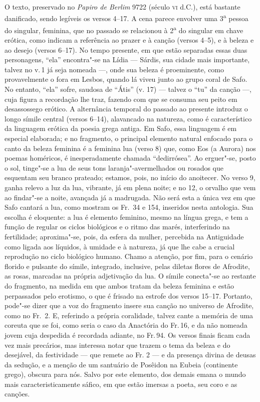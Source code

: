 {{\small O texto, preservado no \textit{Papiro de Berlim} 9722 (século \textsc{vi}
d.C.), está bastante danificado, sendo legíveis os versos 4--17.
A cena parece envolver uma 3\textsuperscript{a} pessoa do
singular, feminina, que no passado se relacionou à 2\textsuperscript{a} do
singular em chave erótica, como indicam a referência ao prazer e à canção		
(versos 4--5), e à beleza e ao desejo (versos 6--17). No tempo presente, 
em que estão separadas essas duas personagens, ``ela” encontra"-se na Lídia --- Sárdis, sua cidade mais importante, talvez no v.\,1 já seja nomeada ---, onde sua beleza é proeminente, como provavelmente o fora em Lesbos, quando lá viveu junto ao grupo coral de Safo. No entanto, ``ela” sofre, saudosa de ``Átis” (v.
17) --- talvez o ``tu” da canção ---, cuja figura a recordação lhe traz, fazendo
com que se consuma seu peito em desassossego erótico. A alternância temporal do
passado ao presente introduz o longo símile central (versos 6--14), alavancado
na natureza, como é característico da linguagem erótica da poesia grega antiga.
Em Safo, essa linguagem é em especial elaborada; e no fragmento, o principal
elemento natural enfocado para o canto da beleza feminina é a feminina lua
(verso 8) que, como Eos (a Aurora) nos poemas homéricos, é inesperadamente
chamada ``dedirrósea”. Ao erguer"-se, posto o sol, tinge"-se a lua
de seus tons laranja"-avermelhados ou rosados que esquentam seu branco prateado;
estamos, pois, no início do anoitecer. No verso 9, ganha relevo a luz da lua,
vibrante, já em plena noite; e no 12, o orvalho que vem ao findar"-se a noite,
avançada já a madrugada. Não será esta a única vez em que Safo cantará a lua,
como mostram os Fr.~34 e 154, inseridos nesta antologia. Sua escolha é
eloquente: a lua é elemento feminino, mesmo na língua grega, e tem a função de
regular os ciclos biológicos e o ritmo das marés, interferindo na fertilidade;
aproxima"-se, pois, da esfera da mulher, percebida na Antiguidade como ligada
aos líquidos, à umidade e à natureza, já que lhe cabe a crucial
reprodução no ciclo biológico humano. Chamo a atenção, por fim, para o cenário
florido e pulsante do símile, integrado, inclusive, pelas diletas flores de
Afrodite, as rosas, marcadas na própria adjetivação da lua. O símile conecta"-se
ao restante do fragmento, na medida em que ambos tratam da beleza feminina e
estão perpassados pelo erotismo, o que é frisado na estrofe dos versos 15--17.
Portanto, pode"-se dizer que a voz do fragmento insere sua canção no universo de
Afrodite, como no Fr.~2.
E, referindo a própria coralidade, talvez cante a memória de uma coreuta que se foi, como seria o caso da Anactória do Fr.\,16, e da não nomeada jovem cuja despedida é recordada adiante, no Fr.\,94.
Os versos finais ficam cada vez mais precários, mas interessa notar que trazem o tema da beleza e do desejável, da festividade --- que remete ao Fr. 2 --- e da presença divina de deusas da sedução, e a menção de um santuário de Posêidon na Eubeia (continente grego), obscura para nós. Salvo por este elemento, dos demais emana o mundo mais caracteristicamente sáfico, em que estão imersas a poeta, seu coro e as canções.}

}
